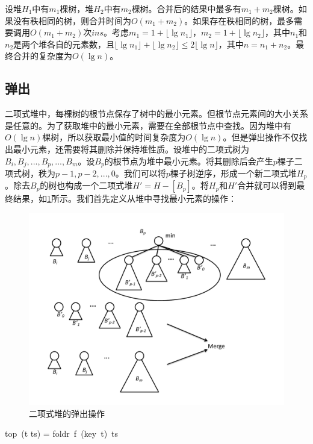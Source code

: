 \documentclass[b5paper]{ctexart}
\begin{document}
设堆$H_1$中有$m_1$棵树，堆$H_2$中有$m_2$棵树。合并后的结果中最多有$m_1 + m_2$棵树。如果没有秩相同的树，则合并时间为$O(m_1 + m_2)$。如果存在秩相同的树，最多需要调用$O(m_1 + m_2)$次$ins$。考虑$m_1 = 1 + \lfloor \lg n_1 \rfloor$，$m_2 = 1 + \lfloor \lg n_2 \rfloor$，其中$n_1$和$n_2$是两个堆各自的元素数，且$\lfloor \lg n_1 \rfloor + \lfloor \lg n_2 \rfloor \leq 2 \lfloor \lg n \rfloor$，其中$n = n_1 + n_2$。最终合并的复杂度为$O(\lg n)$。

\subsection{弹出}

二项式堆中，每棵树的根节点保存了树中的最小元素。但根节点元素间的大小关系是任意的。为了获取堆中的最小元素，需要在全部根节点中查找。因为堆中有$O(\lg n)$棵树，所以获取最小值的时间复杂度为$O(\lg n)$。但是弹出操作不仅找出最小元素，还需要将其删除并保持堆性质。设堆中的二项式树为$B_i, B_j, ..., B_p, ..., B_m$。设$B_p$的根节点为堆中最小元素。将其删除后会产生$p$棵子二项式树，秩为$p-1, p-2, ..., 0$。我们可以将$p$棵子树逆序，形成一个新二项式堆$H_p$。除去$B_p$的树也构成一个二项式堆$H' = H - [B_p]$。将$H_p$和$H'$合并就可以得到最终结果，如\cref{fig:bheap-del-min}所示。我们首先定义从堆中寻找最小元素的操作：

\begin{figure}[htbp]
  \centering
  \includegraphics[scale=0.4]{img/bheap-pop}
  \caption{二项式堆的弹出操作}
  \label{fig:bheap-del-min}
\end{figure}

\be
top\ (t \cons ts) = foldr\ f\ (key\ t)\ ts
\ee
\end{document}
